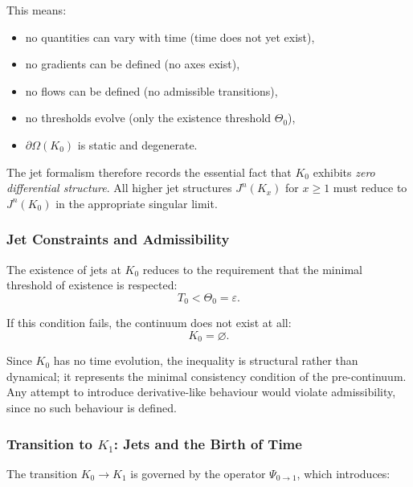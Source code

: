 This means:

\begin{itemize}
    \item no quantities can vary with time (time does not yet exist),
    \item no gradients can be defined (no axes exist),
    \item no flows can be defined (no admissible transitions),
    \item no thresholds evolve (only the existence threshold $\Theta_0$),
    \item $\partial\Omega(K_0)$ is static and degenerate.
\end{itemize}

The jet formalism therefore records the essential fact that $K_0$
exhibits \emph{zero differential structure}. All higher jet structures
$J^n(K_x)$ for $x\ge1$ must reduce to $J^n(K_0)$ in the appropriate
singular limit.



\subsubsection{Jet Constraints and Admissibility}

The existence of jets at $K_0$ reduces to the requirement that the minimal
threshold of existence is respected:
\[
T_0 < \Theta_0 = \varepsilon.
\]

If this condition fails, the continuum does not exist at all:
\[
K_0 = \varnothing.
\]

Since $K_0$ has no time evolution, the inequality is structural rather
than dynamical; it represents the minimal consistency condition of the
pre-continuum. Any attempt to introduce derivative-like behaviour would
violate admissibility, since no such behaviour is defined.



\subsubsection{Transition to \texorpdfstring{\texorpdfstring{$K_1$}{K_1}}{K1}: Jets and the Birth of Time}

The transition $K_0 \to K_1$ is governed by the operator $\Psi_{0\to1}$,
which introduces:

